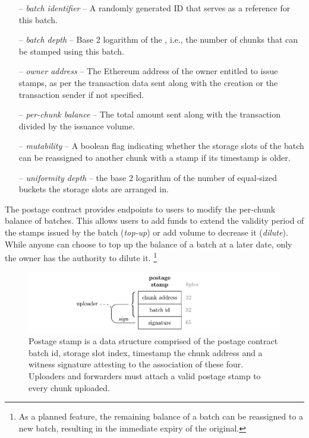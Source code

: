 \begin{itemize}[noitemsep]
\item[--] \emph{batch identifier} -- A randomly generated ID that serves as a reference for this batch.
\item[--] \emph{batch depth} -- Base 2 logarithm of the , i.e., the number of chunks that can be stamped using this batch. 
\item[--] \emph{owner address} -- The Ethereum address of the owner entitled to issue stamps, as per the transaction data sent along with the creation or the  transaction sender if not specified.
\item[--] \emph{per-chunk balance} -- The total amount sent along with the transaction divided by the issuance volume.
\item[--] \emph{mutability} -- A boolean flag indicating whether the storage slots of the batch can be reassigned to another chunk with a stamp if its timestamp is older. 
\item[--] \emph{uniformity depth} -- the base 2 logarithm of the number of equal-sized buckets the storage slots are arranged in.
\end{itemize}

The postage contract provides endpoints to users to modify the per-chunk balance of batches. This allows users to add funds to extend the validity period of the stamps issued by the batch (\/\emph{top-up}) or add volume to decrease it (\/\emph{dilute}).
While anyone can choose to top up the balance of a batch at a later date, only the owner has the authority to dilute it.%
%
\footnote{As a planned feature, the remaining balance of a batch can be reassigned to a new batch, resulting in the immediate expiry of the original.}



\begin{figure}[!ht]
  \centering
    \includegraphics[width=\textwidth]{fig/postage-stamp-structure.pdf}
  \caption[Postage stamp]{Postage stamp is a data structure comprised of the postage contract batch id, storage slot index, timestamp the chunk address and a witness signature attesting to the association of these four. Uploaders and forwarders must attach a valid postage stamp to every chunk uploaded. }
  \label{fig:postage-stamp}
\end{figure}


